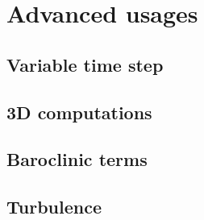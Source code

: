 \documentclass{report}
\newcommand{\todo}[1]{This section still has to be written by #1}
\begin{document}


\section{Advanced usages}

	\subsection{Variable time step}
	

	\subsection{3D computations}
	

	\subsection{Baroclinic terms}
	


	\subsection{Turbulence}
	



\end{document}

